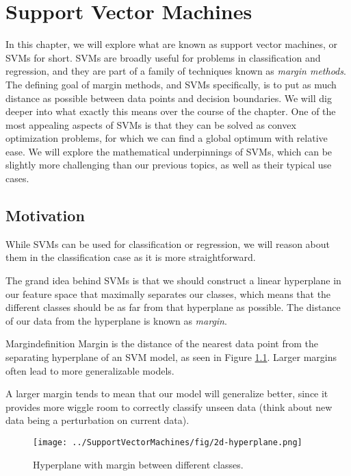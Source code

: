 \chapter{Support Vector Machines}
In this chapter, we will explore what are known as support vector machines, or SVMs for short. SVMs are broadly useful for problems in classification and regression, and they are part of a family of techniques known as \textit{margin methods}. The defining goal of margin methods, and SVMs specifically, is to put as much distance as possible between data points and decision boundaries. We will dig deeper into what exactly this means over the course of the chapter. One of the most appealing aspects of SVMs is that they can be solved as convex optimization problems, for which we can find a global optimum with relative ease. We will explore the mathematical underpinnings of SVMs, which can be slightly more challenging than our previous topics, as well as their typical use cases.

\section{Motivation}
While SVMs can be used for classification or regression, we will reason about them in the classification case as it is more straightforward. 

The grand idea behind SVMs is that we should construct a linear hyperplane in our feature space that maximally separates our classes, which means that the different classes should be as far from that hyperplane as possible. The distance of our data from the hyperplane is known as \textit{margin}.

\begin{definition}{Margin}{definition}
Margin is the distance of the nearest data point from the separating hyperplane of an SVM model, as seen in Figure \ref{fig:2d-hyperplane}. Larger margins often lead to more generalizable models.
\end{definition}

A larger margin tends to mean that our model will generalize better, since it provides more wiggle room to correctly classify unseen data (think about new data being a perturbation on current data).

\begin{figure}
    \centering
    \texttt{[image: ../SupportVectorMachines/fig/2d-hyperplane.png]}
    \caption{Hyperplane with margin between different classes.}
    \label{fig:2d-hyperplane}
\end{figure}

